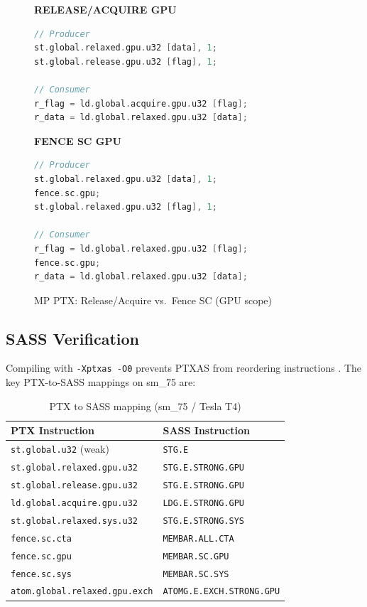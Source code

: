 \documentclass[a4paper]{article}
\begin{document}
\begin{figure}[h]
\centering
\begin{minipage}{0.45\textwidth}
\centering
\textbf{RELEASE/ACQUIRE GPU}
\begin{lstlisting}[language=C]
// Producer
st.global.relaxed.gpu.u32 [data], 1;
st.global.release.gpu.u32 [flag], 1;

// Consumer
r_flag = ld.global.acquire.gpu.u32 [flag];
r_data = ld.global.relaxed.gpu.u32 [data];
\end{lstlisting}
\end{minipage}
\hfill
\begin{minipage}{0.45\textwidth}
\centering
\textbf{FENCE SC GPU}
\begin{lstlisting}[language=C]
// Producer
st.global.relaxed.gpu.u32 [data], 1;
fence.sc.gpu;
st.global.relaxed.gpu.u32 [flag], 1;

// Consumer
r_flag = ld.global.relaxed.gpu.u32 [flag];
fence.sc.gpu;
r_data = ld.global.relaxed.gpu.u32 [data];
\end{lstlisting}
\end{minipage}
\caption{MP PTX: Release/Acquire vs.\ Fence SC (GPU scope)}
\end{figure}

\subsection{SASS Verification}

Compiling with \texttt{-Xptxas -O0} prevents PTXAS from reordering instructions \cite{nvidia_ptx_isa}.
The key PTX-to-SASS mappings on sm\_75 are:

\begin{table}[h]
\centering
\small
\caption{PTX to SASS mapping (sm\_75 / Tesla T4)}
\label{tab:ptx-sass}
\begin{tabular}{ll}
\toprule
\textbf{PTX Instruction} & \textbf{SASS Instruction} \\
\midrule
\texttt{st.global.u32} (weak)             & \texttt{STG.E} \\
\texttt{st.global.relaxed.gpu.u32}        & \texttt{STG.E.STRONG.GPU} \\
\texttt{st.global.release.gpu.u32}        & \texttt{STG.E.STRONG.GPU} \\
\texttt{ld.global.acquire.gpu.u32}        & \texttt{LDG.E.STRONG.GPU} \\
\texttt{st.global.relaxed.sys.u32}        & \texttt{STG.E.STRONG.SYS} \\
\texttt{fence.sc.cta}                     & \texttt{MEMBAR.ALL.CTA} \\
\texttt{fence.sc.gpu}                     & \texttt{MEMBAR.SC.GPU} \\
\texttt{fence.sc.sys}                     & \texttt{MEMBAR.SC.SYS} \\
\texttt{atom.global.relaxed.gpu.exch}     & \texttt{ATOMG.E.EXCH.STRONG.GPU} \\
\bottomrule
\end{tabular}
\end{table}
\end{document}
